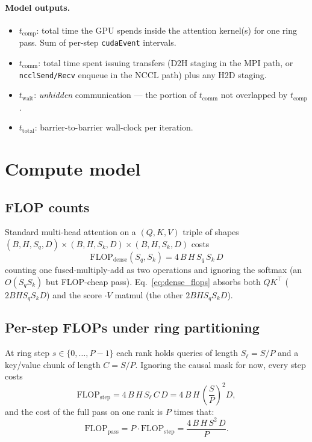 \documentclass[11pt]{article}
\newcommand{\flops}{\mathrm{FLOP}}
\newcommand{\comp}{\mathrm{comp}}
\newcommand{\comm}{\mathrm{comm}}
\newcommand{\wait}{\mathrm{wait}}
\newcommand{\tot}{\mathrm{total}}
\newcommand{\step}{\mathrm{step}}
\begin{document}
\paragraph{Model outputs.}
\begin{itemize}
  \item $t_\comp$: total time the GPU spends inside the attention kernel(s)
        for one ring pass. Sum of per-step \texttt{cudaEvent} intervals.
  \item $t_\comm$: total time spent issuing transfers (D2H staging in
        the MPI path, or \texttt{ncclSend/Recv} enqueue in the NCCL path)
        plus any H2D staging.
  \item $t_\wait$: \emph{unhidden} communication --- the portion of
        $t_\comm$ not overlapped by $t_\comp$.
  \item $t_\tot$: barrier-to-barrier wall-clock per iteration.
\end{itemize}

\section{Compute model}
\label{sec:compute}

\subsection{FLOP counts}

Standard multi-head attention on a $(Q, K, V)$ triple of shapes
$(B, H, S_q, D) \times (B, H, S_k, D) \times (B, H, S_k, D)$ costs
\begin{equation}
  \flops_{\text{dense}}(S_q, S_k)
  = 4\,B\,H\,S_q\,S_k\,D
  \label{eq:dense_flops}
\end{equation}
counting one fused-multiply-add as two operations and ignoring the
softmax (an $O(S_q S_k)$ but FLOP-cheap pass). Eq.~\eqref{eq:dense_flops}
absorbs both $QK^\top$ ($2 B H S_q S_k D$) and the score $\cdot V$
matmul (the other $2 B H S_q S_k D$).

\subsection{Per-step FLOPs under ring partitioning}

At ring step $s \in \{0, \dots, P-1\}$ each rank holds queries of length
$S_\ell = S/P$ and a key/value chunk of length $C = S/P$. Ignoring the
causal mask for now, every step costs
\begin{equation}
  \flops_\step
  = 4\,B\,H\,S_\ell\,C\,D
  = 4\,B\,H\,\left(\frac{S}{P}\right)^{\!2} D ,
\end{equation}
and the cost of the full pass on one rank is $P$ times that:
\begin{equation}
  \flops_{\text{pass}}
  = P \cdot \flops_\step
  = \frac{4\,B\,H\,S^{2}\,D}{P} .
  \label{eq:pass_flops}
\end{equation}
\end{document}
